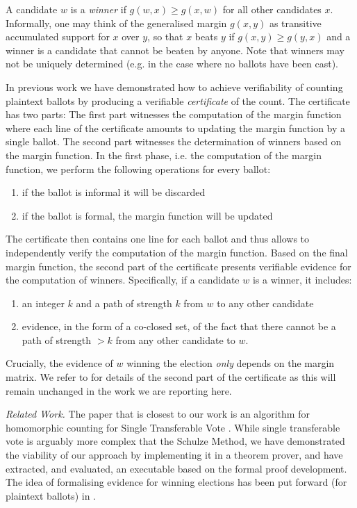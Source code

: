 \documentclass{llncs}
\begin{document}
  A candidate $w$ is a \emph{winner} if $g(w, x) \geq g(x, w)$ for
  all other candidates $x$. Informally, one may think of the
  generalised margin $g(x, y)$ as transitive accumulated support for
  $x$ over $y$, so that $x$ beats $y$ if $g(x,y) \geq g(y, x)$ and a
  winner is a candidate that cannot be beaten by anyone. Note that
  winners may not be uniquely determined (e.g. in the case where no
  ballots have been cast).

  In previous work \cite{Pattinson:2017:SVE} we have demonstrated
  how to achieve verifiability of counting plaintext ballots by
  producing a verifiable \emph{certificate} of the count. The
  certificate has two parts: The first part witnesses the
  computation of the margin function where each line of the
  certificate amounts to updating the margin function by a single
  ballot. The second part witnesses the determination of winners
  based on the margin function. In the first phase, i.e. the
  computation of the margin function, we perform the following
  operations for every ballot:
  \begin{enumerate}
    \item if the ballot is informal it will be discarded
    \item if the ballot is formal, the margin function will be
    updated
  \end{enumerate}
  The certificate then contains one line for each ballot and thus
  allows to independently verify the computation of the margin
  function. Based on the final margin function, the second part of
  the certificate presents verifiable evidence for the computation
  of winners. Specifically, if a candidate $w$ is a winner, it
  includes:
  \begin{enumerate}
    \item an integer $k$ and a path of strength $k$ from $w$ to any
    other candidate
    \item evidence, in the form of a co-closed set, of the fact that
    there cannot be a path of strength $> k$ from any other
    candidate to $w$.
  \end{enumerate}
  Crucially, the evidence of $w$ winning the election \emph{only}
  depends on the margin matrix. 
  We refer to \cite{Pattinson:2017:SVE} for details of the second
  part of the certificate as this will remain unchanged in the work
  we are reporting here.
    
   
\noindent\smallskip\emph{Related Work.} The paper that is closest to
our work is an algorithm for homomorphic counting for Single
Transferable Vote \cite{Benaloh:2009:SSC}. While single transferable
vote is arguably more complex that the Schulze Method, we have
demonstrated the viability of our approach by implementing it in a
theorem prover, and have extracted, and evaluated, an executable
based on the formal proof development. The idea of formalising
evidence for winning elections has been put forward (for plaintext
ballots) in \cite{Pattinson:2015:VCM}. 
\end{document}
